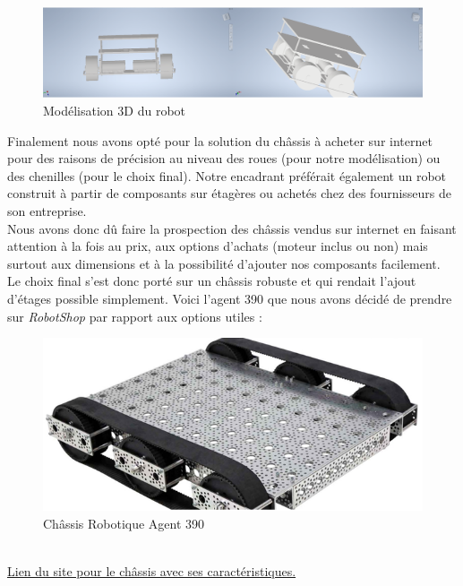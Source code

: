 \documentclass[french]{rapportENSTAB}
\begin{document}
\begin{figure}[H]
    \centering
    \includegraphics[scale=0.70]{images/robot/chassis 3D.png}
    \caption{Modélisation 3D du robot}
    \label{fig:cdcf}
\end{figure}

Finalement nous avons opté pour la solution du châssis à acheter sur internet pour des raisons de précision au niveau des roues (pour notre modélisation) ou des chenilles (pour le choix final). Notre encadrant préférait également un robot construit à partir de composants sur étagères ou achetés chez des fournisseurs de son entreprise.  \\

Nous avons donc dû faire la prospection des châssis vendus sur internet en faisant attention à la fois au prix, aux options d’achats (moteur inclus ou non) mais surtout aux dimensions et à la possibilité d’ajouter nos composants facilement.\\ 

Le choix final s’est donc porté sur un châssis robuste et qui rendait l'ajout d'étages possible simplement. Voici l’agent 390 que nous avons décidé de prendre sur \textit{RobotShop} par rapport aux options utiles : 

\begin{figure}[H]
    \centering
    \includegraphics[scale=0.70]{images/robot/chassis.png}
    \caption{Châssis Robotique Agent 390}
    \label{fig:cdcf}
\end{figure}\\
\href{https://www.robotshop.com/eu/fr/kit-robot-chenilles-agent-390-avec-moteurs.html}{Lien du site pour le châssis avec ses  caractéristiques.}\\
\end{document}
